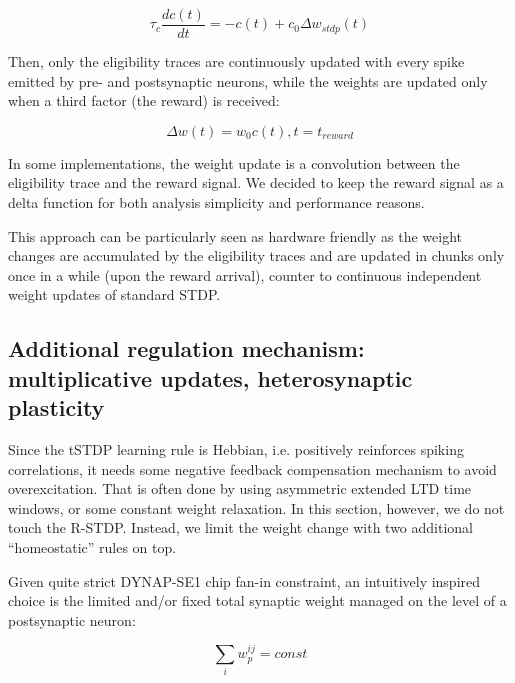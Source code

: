 \begin{equation}
\tau_{c}\frac{dc(t)}{dt} = -c(t) + c_0 \Delta w_{stdp}(t)
\end{equation}

Then, only the eligibility traces are continuously updated with every spike emitted by pre- and postsynaptic neurons, while the weights are updated only when a third factor (the reward) is received:

\begin{equation}
\Delta w(t) = w_0 c(t), t = t_{reward}
\label{eq:reward}
\end{equation}

In some implementations, the weight update is a convolution between the eligibility trace and the reward signal. We decided to keep the reward signal as a delta function for both analysis simplicity and performance reasons.

This approach can be particularly seen as hardware friendly as the weight changes are accumulated by the eligibility traces and are updated in chunks only once in a while (upon the reward arrival), counter to continuous independent weight updates of standard STDP.


\subsection{Additional regulation mechanism: multiplicative updates, heterosynaptic plasticity}

Since the \ac{tSTDP} learning rule is Hebbian, i.e. positively reinforces spiking correlations, it needs some negative feedback compensation mechanism to avoid overexcitation. That is often done by using asymmetric extended \ac{LTD} time windows, or some constant weight relaxation. In this section, however, we do not touch the R-STDP. Instead, we limit the weight change with two additional ``homeostatic'' rules on top. 

Given quite strict DYNAP-SE1 chip fan-in constraint, an intuitively inspired choice is the limited and/or fixed total synaptic weight managed on the level of a postsynaptic neuron:

\begin{equation}
\label{eq:fixed_weight_sum}
    \sum_{i} w^{ij}_p = const
\end{equation}

